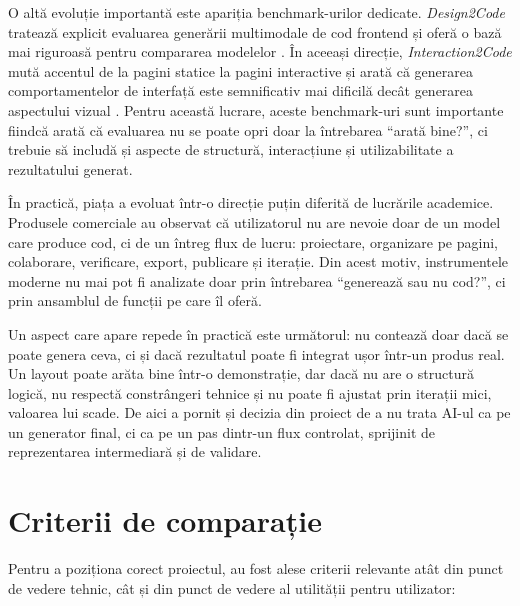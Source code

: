 O altă evoluție importantă este apariția benchmark-urilor dedicate. \textit{Design2Code} tratează explicit evaluarea generării multimodale de cod frontend și oferă o bază mai riguroasă pentru compararea modelelor \cite{si2024design2code}. În aceeași direcție, \textit{Interaction2Code} mută accentul de la pagini statice la pagini interactive și arată că generarea comportamentelor de interfață este semnificativ mai dificilă decât generarea aspectului vizual \cite{xiao2025interaction2code}. Pentru această lucrare, aceste benchmark-uri sunt importante fiindcă arată că evaluarea nu se poate opri doar la întrebarea ``arată bine?'', ci trebuie să includă și aspecte de structură, interacțiune și utilizabilitate a rezultatului generat.

În practică, piața a evoluat într-o direcție puțin diferită de lucrările academice. Produsele comerciale au observat că utilizatorul nu are nevoie doar de un model care produce cod, ci de un întreg flux de lucru: proiectare, organizare pe pagini, colaborare, verificare, export, publicare și iterație. Din acest motiv, instrumentele moderne nu mai pot fi analizate doar prin întrebarea ``generează sau nu cod?'', ci prin ansamblul de funcții pe care îl oferă.

Un aspect care apare repede în practică este următorul: nu contează doar dacă se poate genera ceva, ci și dacă rezultatul poate fi integrat ușor într-un produs real. Un layout poate arăta bine într-o demonstrație, dar dacă nu are o structură logică, nu respectă constrângeri tehnice și nu poate fi ajustat prin iterații mici, valoarea lui scade. De aici a pornit și decizia din proiect de a nu trata AI-ul ca pe un generator final, ci ca pe un pas dintr-un flux controlat, sprijinit de reprezentarea intermediară și de validare.

\section{Criterii de comparație}

Pentru a poziționa corect proiectul, au fost alese criterii relevante atât din punct de vedere tehnic, cât și din punct de vedere al utilității pentru utilizator:

